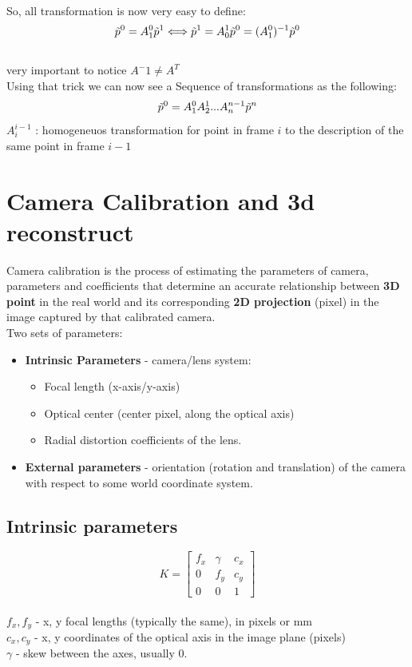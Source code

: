 \documentclass{article}
\begin{document}
    \\ So, all transformation is now very easy to define:
    \begin{gather*}
        \Tilde{p}^0 = A^0_1\Tilde{p}^1 \Longleftrightarrow \Tilde{p}^1 = A^1_0\Tilde{p}^0 = (A^0_1)^{-1}\Tilde{p}^0
    \end{gather*}
    \\very important to notice $A^-1\ne A^T$
    \\Using that trick we can now see a Sequence of transformations as the following:
    \begin{gather}
        \Tilde{p}^0 = A^0_1A^1_2...A^{n-1}_n\Tilde{p}^n
    \end{gather}
    $A^{i-1}_i$ : homogeneuos transformation for point in frame $i$ to the description of the same point in frame $i-1$

\section{Camera Calibration and 3d reconstruct}
Camera calibration is the process of estimating the parameters of camera, parameters and coefficients that determine an accurate relationship between \textbf{3D point} in the real world and its corresponding \textbf{2D projection} (pixel) in the image captured by that calibrated camera.\\
Two sets of parameters:
\begin{itemize}
    \item \textbf{Intrinsic Parameters} - camera/lens system:
    \begin{itemize}
        \item Focal length (x-axis/y-axis)
        \item Optical center (center pixel, along the optical axis)
        \item Radial distortion coefficients of the lens.
    \end{itemize}
    \item \textbf{External parameters} - orientation (rotation and translation) of the camera with respect to some world coordinate system.
\end{itemize}
\subsection{Intrinsic parameters}
$$K = \begin{bmatrix}
f_x & \gamma & c_x \\
0 & f_y & c_y \\
0 & 0 & 1 
\end{bmatrix} $$\\
$f_x, f_y$ - x, y focal lengths (typically the same), in pixels or mm \\
$c_x, c_y$ - x, y coordinates of the optical axis in the image plane (pixels) \\
$\gamma$ - skew between the axes, usually 0.
\end{document}
